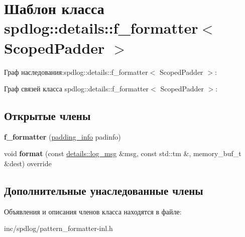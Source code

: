 \hypertarget{classspdlog_1_1details_1_1f__formatter}{}\section{Шаблон класса spdlog\+:\+:details\+:\+:f\+\_\+formatter$<$ Scoped\+Padder $>$}
\label{classspdlog_1_1details_1_1f__formatter}


Граф наследования\+:spdlog\+:\+:details\+:\+:f\+\_\+formatter$<$ Scoped\+Padder $>$\+:


Граф связей класса spdlog\+:\+:details\+:\+:f\+\_\+formatter$<$ Scoped\+Padder $>$\+:
\subsection*{Открытые члены}
\begin{DoxyCompactItemize}
\item 
\mbox{\label{classspdlog_1_1details_1_1f__formatter_a1c8b0e2c63449db88fce07177065776e}} 
{\bfseries f\+\_\+formatter} (\hyperlink{structspdlog_1_1details_1_1padding__info}{padding\+\_\+info} padinfo)
\item 
\mbox{\label{classspdlog_1_1details_1_1f__formatter_a61949e26c76a7bf34ecb78827b394840}} 
void {\bfseries format} (const \hyperlink{structspdlog_1_1details_1_1log__msg}{details\+::log\+\_\+msg} \&msg, const std\+::tm \&, memory\+\_\+buf\+\_\+t \&dest) override
\end{DoxyCompactItemize}
\subsection*{Дополнительные унаследованные члены}


Объявления и описания членов класса находятся в файле\+:\begin{DoxyCompactItemize}
\item 
inc/spdlog/pattern\+\_\+formatter-\/inl.\+h\end{DoxyCompactItemize}
